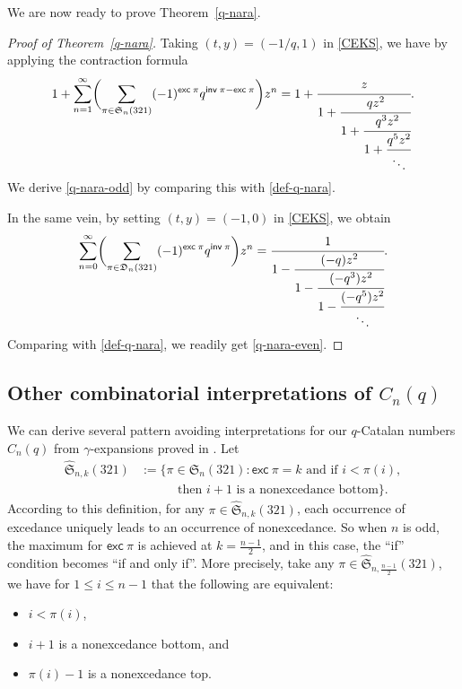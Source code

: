 \documentclass[12pt,reqno]{amsart}
\numberwithin{equation}{section}
\theoremstyle{plain}
\theoremstyle{definition}
\def\S{\mathfrak{S}}
\def\D{\mathfrak{D}}
\def\exc{\mathsf{exc}}
\def\inv{\mathsf{inv}}
\begin{document}
We are now ready to prove Theorem~\ref{q-nara}.














\begin{proof}[Proof of Theorem~\ref{q-nara}]
Taking $(t, y)=(-1/q,1)$ in \eqref{CEKS}, we have by applying the contraction formula
\begin{align*}
1+\sum_{n=1}^{\infty} \biggl(\sum_{\pi\in \S_n(321)}(-1)^{\exc\:\pi} q^{\inv\:\pi-\exc\:\pi}\biggr)z^n=1+\cfrac{z}{1+\cfrac{qz^2}{1+\cfrac{q^3z^2}{1+\cfrac{q^5z^2}{\ddots}}}}.
\end{align*}
We derive \eqref{q-nara-odd}  by comparing this with \eqref{def-q-nara}.

In the same vein, by setting $(t, y)=(-1,0)$ in \eqref{CEKS}, we obtain
\begin{align*}
\sum_{n=0}^{\infty}\biggl(\sum\limits_{\pi\in\D_n(321)}(-1)^{\exc\:\pi}q^{\inv\:\pi}\biggr)z^{n}=\cfrac{1}{1-\cfrac{(-q)z^2}{1-\cfrac{(-q^{3})z^{2}}
{1-\cfrac{(-q^5)z^2}{\ddots}}}}.
\end{align*}
Comparing with \eqref{def-q-nara}, we readily get \eqref{q-nara-even}.
\end{proof}


\subsection{Other combinatorial interpretations of \texorpdfstring{$C_n(q)$}{}}
We can derive several pattern avoiding interpretations for
our $q$-Catalan numbers $C_n(q)$ from $\gamma$-expansions proved in \cite{LF17, Lin17}. Let
\begin{align*}
\widehat{\S}_{n,k}(321) &:=\{\pi\in\S_n(321): \exc\:\pi=k\text{ and if } i<\pi(i),\\
&\phantom{==} \text{ then $i+1$ is a nonexcedance bottom}\}.
\end{align*}
According to this definition, for any $\pi\in\widehat{\S}_{n,k}(321)$, each occurrence of excedance uniquely leads to an occurrence of nonexcedance. So when $n$ is odd, the maximum for $\exc\:\pi$ is achieved at $k=\frac{n-1}{2}$, and in this case, the ``if'' condition becomes ``if and only if''. More precisely, take any $\pi\in\widehat{\S}_{n,\frac{n-1}{2}}(321)$, we have for $1\le i\le n-1$ that the following are equivalent:
\begin{itemize}
    \item $i<\pi(i)$,
    \item $i+1$ is a nonexcedance bottom, and
    \item $\pi(i)-1$ is a nonexcedance top.
\end{itemize}
\end{document}
